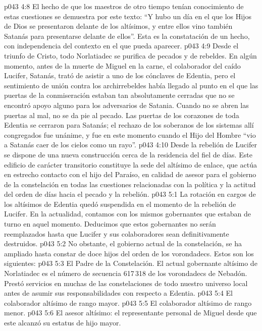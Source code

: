 \vs p043 4:8 El hecho de que los maestros de otro tiempo tenían conocimiento de estas cuestiones se demuestra por este texto: “Y hubo un día en el que los Hijos de Dios se presentaron delante de los altísimos, y entre ellos vino también Satanás para presentarse delante de ellos”. Esta es la constatación de un hecho, con independencia del contexto en el que pueda aparecer.
\vs p043 4:9 \pc Desde el triunfo de Cristo, todo Norlatiadec se purifica de pecados y de rebeldes. En algún momento, antes de la muerte de Miguel en la carne, el colaborador del caído Lucifer, Satanás, trató de asistir a uno de los cónclaves de Edentia, pero el sentimiento de unión contra los archirrebeldes había llegado al punto en el que las puertas de la conmiseración estaban tan absolutamente cerradas que no se encontró apoyo alguno para los adversarios de Satania. Cuando no se abren las puertas al mal, no se da pie al pecado. Las puertas de los corazones de toda Edentia se cerraron para Satanás; el rechazo de los soberanos de los sistemas allí congregados fue unánime, y fue en este momento cuando el Hijo del Hombre “vio a Satanás caer de los cielos como un rayo”.
\vs p043 4:10 Desde la rebelión de Lucifer se dispone de una nueva construcción cerca de la residencia del fiel de días. Este edificio de carácter transitorio constituye la sede del altísimo de enlace, que actúa en estrecho contacto con el hijo del Paraíso, en calidad de asesor para el gobierno de la constelación en todas las cuestiones relacionadas con la política y la actitud del orden de días hacia el pecado y la rebelión.
\vs p043 5:1 La rotación en cargos de los altísimos de Edentia quedó suspendida en el momento de la rebelión de Lucifer. En la actualidad, contamos con los mismos gobernantes que estaban de turno en aquel momento. Deducimos que estos gobernantes no serán reemplazados hasta que Lucifer y sus colaboradores sean definitivamente destruidos.
\vs p043 5:2 No obstante, el gobierno actual de la constelación, se ha ampliado hasta constar de doce hijos del orden de los vorondadecs. Estos son los siguientes:
\vs p043 5:3 El Padre de la Constelación. El actual gobernante altísimo de Norlatiadec es el número de secuencia 617\,318 de los vorondadecs de Nebadón. Prestó servicios en muchas de las constelaciones de todo nuestro universo local antes de asumir sus responsabilidades con respecto a Edentia.
\vs p043 5:4 El colaborador altísimo de rango mayor.
\vs p043 5:5 El colaborador altísimo de rango menor.
\vs p043 5:6 El asesor altísimo: el representante personal de Miguel desde que este alcanzó su estatus de hijo mayor.
